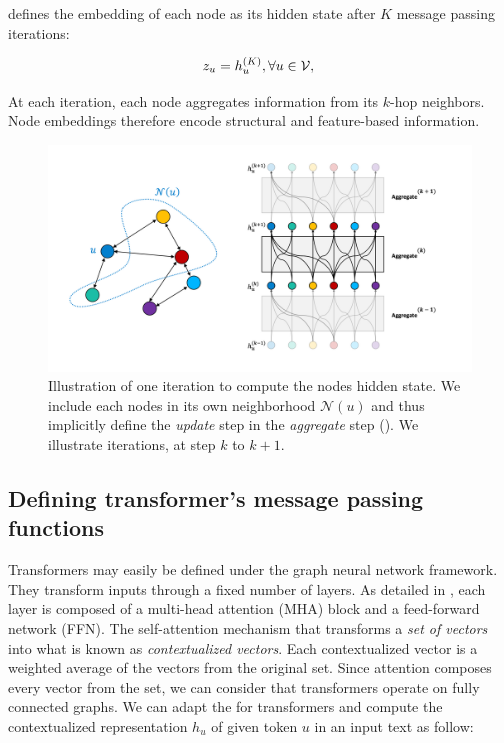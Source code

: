  defines the embedding of each node as its hidden state after $K$ message passing iterations:

\begin{equation}
    z_u = h_u^{(K)}, \forall u \in \mathcal{V}, \labeq{embeddings}\\
\end{equation}

At each iteration, each node aggregates information from its $k$-hop neighbors. Node embeddings therefore encode structural and feature-based information.

\begin{figure}[!htb]
\begin{center}
\includegraphics[width=16cm]{images/graph_update_7.png}
\end{center}
\caption{Illustration of one iteration to compute the nodes hidden state. We include each nodes in its own neighborhood $\mathcal{N}(u)$ and thus implicitly define the \textit{update} step in the \textit{aggregate} step (). We illustrate iterations, at step $k$ to $k+1$.}
\end{figure}

\subsection{Defining transformer's message passing functions}

Transformers \parencite{vaswani_17} may easily be defined under the graph neural network framework. 
They transform inputs through a fixed number of layers.
As detailed in , each layer is composed of a multi-head attention (MHA) block and a feed-forward network (FFN).
The self-attention mechanism that transforms a \textit{set of vectors} into what is known as \textit{contextualized vectors}. 
Each contextualized vector is a weighted average of the vectors from the original set.
Since attention composes every vector from the set, we can consider that transformers operate on fully connected graphs.
We can adapt the  for transformers and compute the contextualized representation $h_u$ of given token $u$ in an input text as follow:

